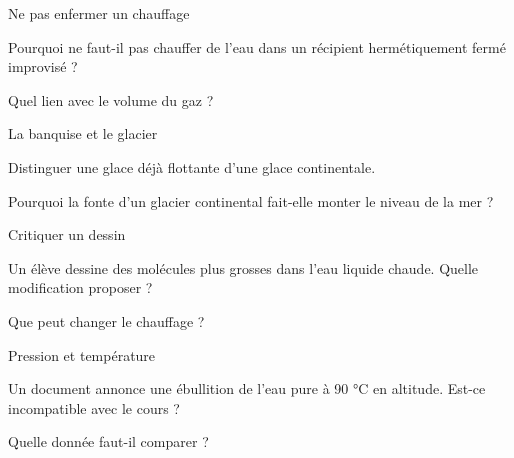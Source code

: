 \clearpage{}
\par\noindent\begin{minipage}{\linewidth}
\begin{exercice}[3]{Ne pas enfermer un chauffage}
\begin{questions}
\item Pourquoi ne faut-il pas chauffer de l’eau dans un récipient hermétiquement fermé improvisé ?
\item Quel lien avec le volume du gaz ?
\end{questions}
\end{exercice}
\end{minipage}
\par\noindent\begin{minipage}{\linewidth}
\begin{exercice}[3]{La banquise et le glacier}
\begin{questions}
\item Distinguer une glace déjà flottante d’une glace continentale.
\item Pourquoi la fonte d’un glacier continental fait-elle monter le niveau de la mer ?
\end{questions}
\end{exercice}
\end{minipage}
\par\noindent\begin{minipage}{\linewidth}
\begin{exercice}[3]{Critiquer un dessin}
\begin{questions}
\item Un élève dessine des molécules plus grosses dans l’eau liquide chaude. Quelle modification proposer ?
\item Que peut changer le chauffage ?
\end{questions}
\end{exercice}
\end{minipage}
\par\noindent\begin{minipage}{\linewidth}
\begin{exercice}[3]{Pression et température}
\begin{questions}
\item Un document annonce une ébullition de l’eau pure à 90 °C en altitude. Est-ce incompatible avec le cours ?
\item Quelle donnée faut-il comparer ?
\end{questions}
\end{exercice}
\end{minipage}
